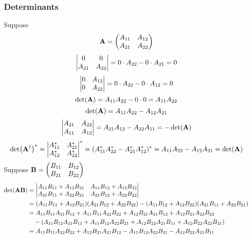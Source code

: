 \documentclass[a4paper]{article}
\begin{document}
\subsubsection{Determinants}
Suppose 
\begin{equation}\label{key}
\vb{A} = \mqty(A_{11} & A_{12}\\A_{21} & A_{22})
\end{equation}
\begin{equation}\label{key}
\mqty|0 & 0\\A_{21} & A_{22}| = 0\cdot A_{22} - 0\cdot A_{21} = 0
\end{equation}
\begin{equation}\label{key}
\mqty|0 & A_{12}\\0 & A_{22}| = 0\cdot A_{22} - 0\cdot A_{12} = 0
\end{equation}
\begin{equation}\label{key}
\det(\vb{A}) = A_{11}A_{22} -  0\cdot 0 = A_{11}A_{22}
\end{equation}
\begin{equation}\label{key}
\det(\vb{A}) = A_{11}A_{22} -  A_{12}A_{21}
\end{equation}
\begin{equation}\label{key}
\mqty| A_{21} & A_{22}\\A_{11} & A_{12} | = A_{21}A_{12} - A_{22}A_{11} = -\det(\vb{A})
\end{equation}
\begin{equation}\label{key}
\det(\vb{A}^\dagger)^* = \mqty|A_{11}^* & A_{21}^*\\A_{12}^* & A_{22}^*|^* = (A_{11}^*A_{22}^* - A_{21}^*A_{12}^*)^* = A_{11}A_{22} -  A_{12}A_{21} = \det(\vb{A})
\end{equation}
Suppose $ \vb{B} = \mqty(B_{11} & B_{12}\\B_{21} & B_{22}) $
\begin{equation}\label{key}
\begin{aligned}
\det(\vb{A}\vb{B}) &= 
\mqty|A_{11}B_{11}+A_{12}B_{21} & A_{11}B_{12}+A_{12}B_{22}\\
A_{21}B_{11}+A_{22}B_{21} & A_{21}B_{12}+A_{22}B_{22}|\\
&= (A_{11}B_{11}+A_{12}B_{21})(A_{21}B_{12}+A_{22}B_{22}) - (A_{11}B_{12}+A_{12}B_{22})(A_{21}B_{11}+A_{22}B_{21})\\
&= A_{11}B_{11}A_{21}B_{12} + A_{11}B_{11}A_{22}B_{22} + A_{12}B_{21}A_{21}B_{12} + A_{12}B_{21}A_{22}B_{22}\\
&\quad - (A_{11}B_{12}A_{21}B_{11} +  A_{11}B_{12}A_{22}B_{21} + A_{12}B_{22}A_{21}B_{11} + A_{12}B_{22}A_{22}B_{21})\\
&= A_{11}B_{11}A_{22}B_{22} + A_{12}B_{21}A_{21}B_{12} - A_{11}B_{12}A_{22}B_{21} - A_{12}B_{22}A_{21}B_{11}
\end{aligned}
\end{equation}
\end{document}
